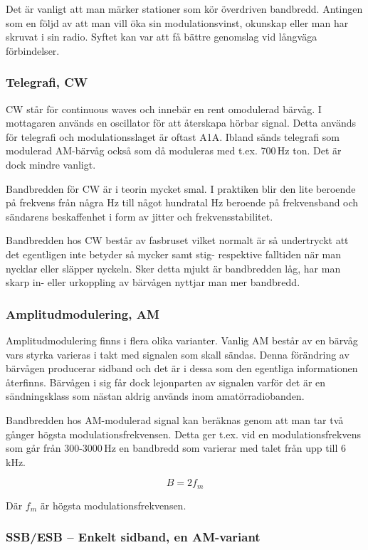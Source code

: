 Det är vanligt att man märker stationer som kör överdriven bandbredd. Antingen
som en följd av att man vill öka sin modulationsvinst, okunskap eller man har
skruvat i sin radio. Syftet kan var att få bättre genomslag vid långväga
förbindelser.

\subsubsection{Telegrafi, CW}

CW står för continuous waves och innebär en rent omodulerad bärvåg. I mottagaren
används en oscillator för att återskapa hörbar signal. Detta används för
telegrafi och modulationsslaget är oftast A1A. Ibland sänds telegrafi som
modulerad AM-bärvåg också som då moduleras med t.ex. 700\,Hz ton. Det är dock
mindre vanligt.

Bandbredden för CW är i teorin mycket smal. I praktiken blir den lite beroende
på frekvens från några Hz till något hundratal Hz beroende på frekvensband och
sändarens beskaffenhet i form av jitter och frekvensstabilitet.

Bandbredden hos CW består av fasbruset vilket normalt är så undertryckt att det
egentligen inte betyder så mycker samt stig- respektive falltiden när man
nycklar eller släpper nyckeln. Sker detta mjukt är bandbredden låg, har man
skarp in- eller urkoppling av bärvågen nyttjar man mer bandbredd.

\subsubsection{Amplitudmodulering, AM}

Amplitudmodulering finns i flera olika varianter. Vanlig AM består av en
bärvåg vars styrka varieras i takt med signalen som skall sändas. Denna
förändring av bärvågen producerar sidband och det är i dessa som den egentliga
informationen återfinns. Bärvågen i sig får dock lejonparten av signalen
varför det är en sändningsklass som nästan aldrig används inom
amatörradiobanden.

Bandbredden hos AM-modulerad signal kan beräknas genom att man tar två gånger
högsta modulationsfrekvensen. Detta ger t.ex. vid en modulationsfrekvens som
går från 300-3000\,Hz en bandbredd som varierar med talet från upp till
6\,kHz.

$$B=2f_m$$

Där $f_m$ är högsta modulationsfrekvensen.

\subsubsection{SSB/ESB -- Enkelt sidband, en AM-variant}

